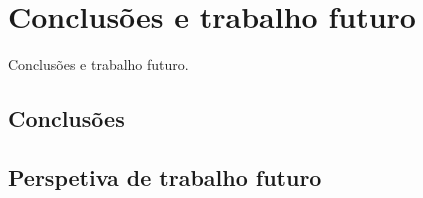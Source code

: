 \chapter{Conclusões e trabalho futuro}
Conclusões e trabalho futuro.

\section{Conclusões}

\section{Perspetiva de trabalho futuro}
		